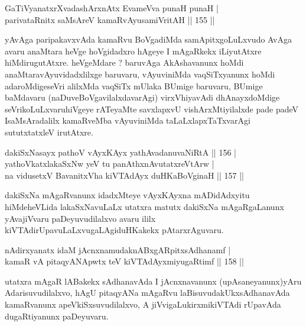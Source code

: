 \begin{shl}
GaTiVyanatxrXvadashArxnAtx EvameVva punaH punaH | \\
parivataRnitx saMsAreV kamaRvAyusamiVritAH \hfill|| 155 || 
\end{shl}

\begin{artha}
yAvAga paripakavxvAda kamaRvu BoVgadiMda samApitxgoLuLxvudo \-AvAga avaru anaMtara heVge hoVgidadxro hAgeye I mAgaRkekx iLiyutAtxre hiMdi\-rugutAtxre. heVgeMdare ? baruvAga AkAshavanunx hoMdi anaMtaravAyuvidadxlilxge baruvaru, vAyuviniMda vaqSiTxyanunx hoMdi adaroMdigeseVri alilxMda vaqSiTx mUlaka BUmige baruvaru, BUmige baMdavaru (naDuveBoVgavilalxdavarAgi) virxVhiyavAdi dhAnayxdoMdige seVrikoLuLxvaruhiVgeye rATeyaMte savxlapxvU \break vishArxMtiyilalxde pade padeV IsaMsAradalilx kamaRveMba vAyuviniMda taLaLxlapxTaTxva\-rAgi sututxtatxleV irutAtxre.
\end{artha}


\begin{shl}
dakiSxNasayx pathoV vAyxKAyx yathAvadanuvaNiRtA \hfill|| 156 | \\
yathoVkatxlakaSxNw yeV tu panAthxnAvutatxreVtArw | \\
na vidusetxV BavanitxVha kiVTAdAyx duHKaBoVginaH \hfill|| 157 || 
\end{shl}

\begin{artha}
dakiSxNa mAgaRvanunx idadxMteye vAyxKAyxna mADidAdxyitu hiMdeheVLida lakaSxNavuLaLx utatxra matutx dakiSxNa mAgaRgaLanunx yAvajiVvaru paDeyuvudilalxvo avaru ililx kiVTAdirUpavuLaLxvugaLAgiduHKakekx pAtarxrAguvaru.
\end{artha}


\begin{shl}
nA\s \s dirxyanatx idaM jAcnxnamudaknABxgARpitxsAdhanamf | \\
kamaR vA pitaqyANApwtx teV kiVTAdAyxmiyugaRtimf \hfill|| 158 || 
\end{shl}

\begin{artha}
utatxra mAgaR lABakekx sAdhanavAda I jAcnxnavanunx (upAsaneyanunx)yAru Adarisuvudilalxvo, hAgU pitaqyANa mAgaRvu laBisuvudakUkxsAdhanavAda kamaR\-vanunx apeVkiSxsuvudilalxvo, A jiVvigaLukirxmikiVTAdi rUpavAda dugaRtiyanunx paDeyuvaru.
\end{artha}

